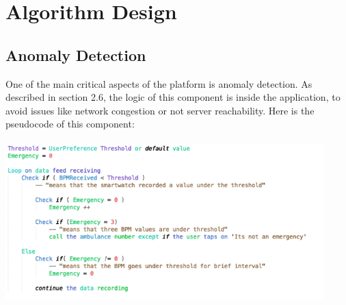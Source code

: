 \newpage
\section{Algorithm Design}

	\subsection{Anomaly Detection}
	One of the main critical aspects of the platform is anomaly detection. As described in section 2.6, the logic of this component is inside the application, to avoid issues like network congestion or not server reachability. \newline
		Here is the pseudocode of this component:
		\\\\
		\centering
		\includegraphics[height=6.00cm,keepaspectratio]{Figures/EmercencyPseudoCode}